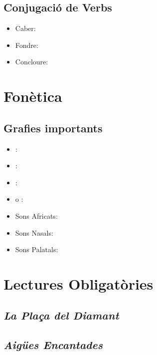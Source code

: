 \documentclass[arial,a4paper,print]{article}
\begin{document}
\subsection{Conjugació de Verbs}
\begin{itemize}
\item Caber: 
\item Fondre: 
\item Concloure: 



\end{itemize}

\section{Fonètica}
\subsection{Grafies importants}
\begin{itemize}

\item \textipa{[z]}: 
\item \textipa{[s]}: 
\item \textipa{[tS]}: 
\item \textipa{[Z]} o \textipa{[dZ]}: 
\item Sons Africats: 
\item Sons Nasals: 
\item Sons Palatals: 

\end{itemize}

\section{Lectures Obligatòries}

\subsection{\textit{La Plaça del Diamant}}

\subsection{\textit{Aigües Encantades}}



	
\end{document}
